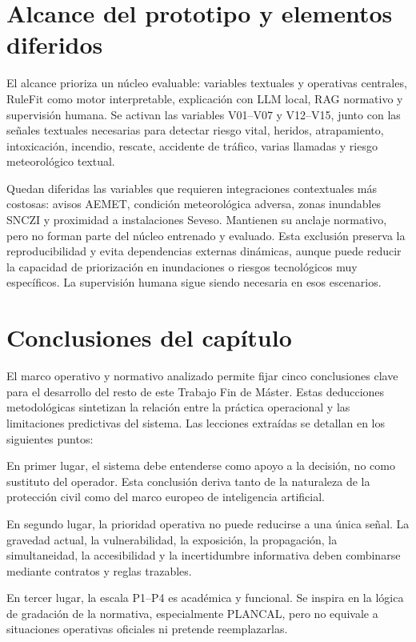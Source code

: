 \section{Alcance del prototipo y elementos diferidos}

El alcance prioriza un núcleo evaluable: variables textuales y operativas centrales, RuleFit como motor interpretable, explicación con LLM local, RAG normativo y supervisión humana. Se activan las variables V01--V07 y V12--V15, junto con las señales textuales necesarias para detectar riesgo vital, heridos, atrapamiento, intoxicación, incendio, rescate, accidente de tráfico, varias llamadas y riesgo meteorológico textual.

Quedan diferidas las variables que requieren integraciones contextuales más costosas: avisos AEMET, condición meteorológica adversa, zonas inundables SNCZI y proximidad a instalaciones Seveso. Mantienen su anclaje normativo, pero no forman parte del núcleo entrenado y evaluado. Esta exclusión preserva la reproducibilidad y evita dependencias externas dinámicas, aunque puede reducir la capacidad de priorización en inundaciones o riesgos tecnológicos muy específicos. La supervisión humana sigue siendo necesaria en esos escenarios.

\section{Conclusiones del capítulo}

El marco operativo y normativo analizado permite fijar cinco conclusiones clave para el desarrollo del resto de este Trabajo Fin de Máster. Estas deducciones metodológicas sintetizan la relación entre la práctica operacional y las limitaciones predictivas del sistema. Las lecciones extraídas se detallan en los siguientes puntos:

En primer lugar, el sistema debe entenderse como apoyo a la decisión, no como sustituto del operador. Esta conclusión deriva tanto de la naturaleza de la protección civil como del marco europeo de inteligencia artificial.

En segundo lugar, la prioridad operativa no puede reducirse a una única señal. La gravedad actual, la vulnerabilidad, la exposición, la propagación, la simultaneidad, la accesibilidad y la incertidumbre informativa deben combinarse mediante contratos y reglas trazables.

En tercer lugar, la escala P1--P4 es académica y funcional. Se inspira en la lógica de gradación de la normativa, especialmente PLANCAL, pero no equivale a situaciones operativas oficiales ni pretende reemplazarlas.

